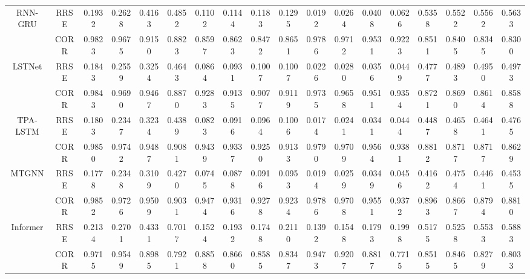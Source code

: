 \documentclass[final,12pt]{elsarticle}
\begin{document}
\begin{landscape}
\begin{table}[h]
\begin{subtable}[h]{0.48\textwidth}
\begin{center}
\begin{tabular}{|*{18}{c|}}
    \hline
    \multirow{2}{*}{RNN-GRU}  %
    & RRSE 
    & 0.1932 & 0.2628 & 0.4163 & 0.4852 
    & 0.1102 & 0.1144 & 0.1183 & 0.1295 
    & 0.0192 & 0.0264 & 0.0408 & 0.0626 
    & 0.5358 & 0.5522 & 0.5562 & 0.5633  \\
    \cline{2-18}
    & CORR 
    & 0.9823 & 0.9675 & 0.9150 & 0.8823 
    & 0.8597 & 0.8623 & 0.8472 & 0.8651 
    & 0.9786 & 0.9712 & 0.9531 & 0.9223 
    & 0.8511 & 0.8405 & 0.8345 & 0.8300  \\

    \hline
    \multirow{2}{*}{LSTNet}  %
    & RRSE 
    & 0.1843 & 0.2559 & 0.3254 & 0.4643 
    & 0.0864 & 0.0931 & 0.1007 & 0.1007 
    & 0.0226 & 0.0280 & 0.0356 & 0.0449 
    & 0.4777 & 0.4893 & 0.4950 & 0.4973  \\
    \cline{2-18}
    & CORR 
    & 0.9843 & 0.9690 & 0.9467 & 0.8870 
    & 0.9283 & 0.9135 & 0.9077 & 0.9119 
    & 0.9735 & 0.9658 & 0.9511 & 0.9354 
    & 0.8721 & 0.8690 & 0.8614 & 0.8588  \\

    \hline
    \multirow{2}{*}{TPA-LSTM}  %
    & RRSE 
    & 0.1803 & 0.2347 & 0.3234 & 0.4389 
    & 0.0823 & 0.0916 & 0.0964 & 0.1006 
    & 0.0174 & 0.0241 & 0.0341 & 0.0444 
    & 0.4487 & 0.4658 & 0.4641 & 0.4765  \\
    \cline{2-18}
    & CORR 
    & 0.9850 & 0.9742 & 0.9487 & 0.9081 
    & 0.9439 & 0.9337 & 0.9250 & 0.9133 
    & 0.9790 & 0.9709 & 0.9564 & 0.9381 
    & 0.8812 & 0.8717 & 0.8717 & 0.8629  \\

    \hline
    \multirow{2}{*}{MTGNN}  %
    & RRSE 
    & 0.1778 & 0.2348 & 0.3109 & 0.4270 
    & 0.0745 & 0.0878 & 0.0916 & 0.0953 
    & 0.0194 & 0.0259 & 0.0349 & 0.0456 
    & 0.4162 & 0.4754 & 0.4461 & 0.4535  \\
    \cline{2-18}
    & CORR 
    & 0.9852 & 0.9726 & 0.9509 & 0.9031 
    & 0.9474 & 0.9316 & 0.9278 & 0.9234 
    & 0.9786 & 0.9708 & 0.9551 & 0.9372 
    & 0.8963 & 0.8667 & 0.8794 & 0.8810  \\

    \hline
    \multirow{2}{*}{Informer}  %
    & RRSE 
    & 0.2134 & 0.2701 & 0.4331 & 0.7017 
    & 0.1524 & 0.1932 & 0.1748 & 0.2110 
    & 0.1392 & 0.1548 & 0.1793 & 0.1998 
    & 0.5175 & 0.5258 & 0.5533 & 0.5883  \\
    \cline{2-18}
    & CORR 
    & 0.9715 & 0.9549 & 0.8985 & 0.7921 
    & 0.8858 & 0.8660 & 0.8585 & 0.8347 
    & 0.9473 & 0.9207 & 0.8817 & 0.7715 
    & 0.8515 & 0.8465 & 0.8279 & 0.8033  \\


\end{tabular}
\end{center}
\end{subtable}
\end{table}
\end{landscape}
\end{document}
